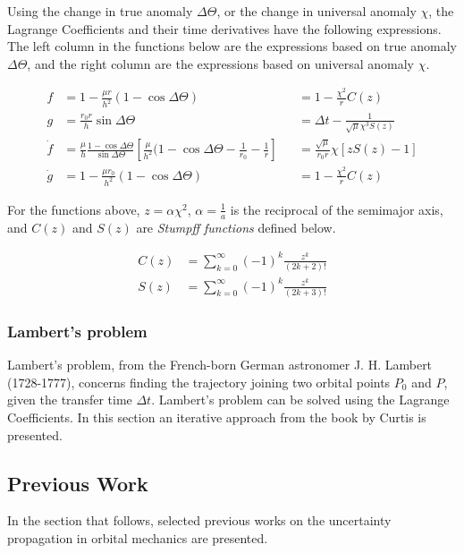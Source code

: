 Using the change in true anomaly $\Delta \Theta$, or the change in universal anomaly $\chi$, the Lagrange Coefficients and their time derivatives have the following expressions. The left column in the functions below are the expressions based on true anomaly $\Delta \Theta$, and the right column are the expressions based on universal anomaly $\chi$.

\begin{align}
    f &= 1 - \frac{ \mu r }{ h^2 } ( 1 - \cos{\Delta \Theta} ) &&= 1 - \frac{\chi^2}{r} C(z)
    \label{eq:lagrange_anomaly_f} \\
    g  &= \frac{ r_0 r }{ h } \sin{\Delta \Theta} &&= \Delta t - \frac{1}{\sqrt{\mu} \chi^3 S( z )}
    \label{eq:lagrange_anomaly_g} \\
    \dot{f} &= \frac{\mu}{h} \frac{1 - \cos{\Delta \Theta}}{\sin{\Delta \Theta}} [ \frac{\mu}{h^2} (1 - \cos{\Delta \Theta} - \frac{1}{r_0} - \frac{1}{r} ] &&= \frac{\sqrt{\mu}}{r_0 r} \chi [z S(z) - 1]
    \label{eq:lagrange_anomaly_f_dot} \\
    \dot{g} &= 1 - \frac{\mu r_0}{h^2} (1 - \cos{\Delta \Theta} ) &&= 1 - \frac{\chi^2}{r} C(z)
    \label{eq:lagrange_anomaly_g_dot}
\end{align}

For the functions above, $z = \alpha \chi^2$, $\alpha = \frac{1}{a}$ is the reciprocal of the semimajor axis, and $C(z)$ and $S(z)$ are \textit{Stumpff functions} defined below.

\begin{align}
    C(z) &= \sum_{k = 0}^{\infty} (-1)^k \frac{z^k}{(2k + 2)!} \\
    S(z) &= \sum_{k = 0}^{\infty} (-1)^k \frac{z^k}{(2k + 3)!}
\end{align}{}

\subsubsection{Lambert's problem}

Lambert's problem, from the French-born German astronomer J. H. Lambert (1728-1777), concerns finding the trajectory joining two orbital points $P_0$ and $P$, given the transfer time $\Delta t$. Lambert's problem can be solved using the Lagrange Coefficients. In this section an iterative approach from the book by Curtis \cite{Curtis2009} is presented.










\subsection{Previous Work}

In the section that follows, selected previous works on the uncertainty propagation in orbital mechanics are presented.  \\



